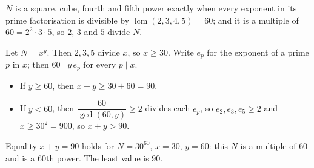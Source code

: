 $N$ is a square, cube, fourth and fifth power exactly when every exponent in its prime factorisation is divisible by $\operatorname{lcm}(2,3,4,5)=60$; and it is a multiple of $60=2^2\cdot3\cdot5$, so $2$, $3$ and $5$ divide $N$.

Let $N=x^y$. Then $2,3,5$ divide $x$, so $x\ge30$. Write $e_p$ for the exponent of a prime $p$ in $x$; then $60\mid y\,e_p$ for every $p\mid x$.
\begin{itemize}
\item If $y\ge60$, then $x+y\ge30+60=90$.
\item If $y<60$, then $\dfrac{60}{\gcd(60,y)}\ge2$ divides each $e_p$, so $e_2,e_3,e_5\ge2$ and $x\ge30^2=900$, so $x+y>90$.
\end{itemize}
Equality $x+y=90$ holds for $N=30^{60}$, $x=30$, $y=60$: this $N$ is a multiple of $60$ and is a $60$th power. The least value is $\boxed{90}$.
